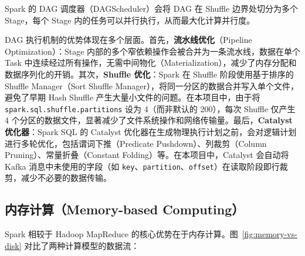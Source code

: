 \documentclass[12pt,a4paper]{article}
\begin{document}
Spark 的 DAG 调度器（DAGScheduler）会将 DAG 在 Shuffle 边界处切分为多个 Stage，每个 Stage 内的任务可以并行执行，从而最大化计算并行度。

DAG 执行机制的优势体现在多个层面。首先，\textbf{流水线优化}（Pipeline Optimization）：Stage 内部的多个窄依赖操作会被合并为一条流水线，数据在单个 Task 中连续经过所有操作，无需中间物化（Materialization），减少了内存分配和数据序列化的开销。其次，\textbf{Shuffle 优化}：Spark 在 Shuffle 阶段使用基于排序的 Shuffle Manager（Sort Shuffle Manager），将同一分区的数据合并写入单个文件，避免了早期 Hash Shuffle 产生大量小文件的问题。在本项目中，由于将 \texttt{spark.sql.shuffle.partitions} 设为 4（而非默认的 200），每次 Shuffle 仅产生 4 个分区的数据文件，显著减少了文件系统操作和网络传输量。最后，\textbf{Catalyst 优化器}：Spark SQL 的 Catalyst 优化器在生成物理执行计划之前，会对逻辑计划进行多轮优化，包括谓词下推（Predicate Pushdown）、列裁剪（Column Pruning）、常量折叠（Constant Folding）等。在本项目中，Catalyst 会自动将 Kafka 消息中未使用的字段（如 \texttt{key}、\texttt{partition}、\texttt{offset}）在读取阶段即行裁剪，减少不必要的数据传输。

\subsection{内存计算（Memory-based Computing）}

Spark 相较于 Hadoop MapReduce 的核心优势在于内存计算。图~\ref{fig:memory-vs-disk} 对比了两种计算模型的数据流：
\end{document}
